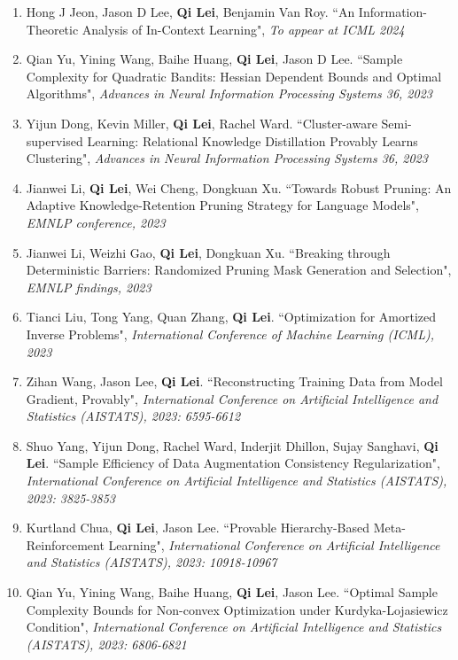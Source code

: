 \documentclass[margin, 10pt]{res} %
\begin{document}
\begin{resume}
\begin{enumerate}
\item{Hong J Jeon, Jason D Lee, \textbf{Qi Lei}, Benjamin Van Roy. ``An Information-Theoretic Analysis of In-Context Learning", \textit{To appear at ICML 2024}
}
\item{Qian Yu, Yining Wang, Baihe Huang, \textbf{Qi Lei}, Jason D Lee. ``Sample Complexity for Quadratic Bandits: Hessian Dependent Bounds and Optimal Algorithms", \textit{Advances in Neural Information Processing Systems 36, 2023}}
	
\item{Yijun Dong, Kevin Miller, \textbf{Qi Lei}, Rachel Ward. ``Cluster-aware Semi-supervised Learning: Relational Knowledge Distillation Provably Learns Clustering", \textit{Advances in Neural Information Processing Systems 36, 2023}}
	
\item{Jianwei Li, \textbf{Qi Lei}, Wei Cheng, Dongkuan Xu. ``Towards Robust Pruning: An Adaptive Knowledge-Retention Pruning Strategy for Language Models", \textit{EMNLP conference, 2023}}

\item{Jianwei Li, Weizhi Gao, \textbf{Qi Lei}, Dongkuan Xu. ``Breaking through Deterministic Barriers: Randomized Pruning Mask Generation and Selection", \textit{EMNLP findings, 2023}}
	
\item{Tianci Liu, Tong Yang, Quan Zhang, \textbf{Qi Lei}. ``Optimization for Amortized Inverse Problems", \textit{International Conference of Machine Learning (ICML), 2023}}
	
\item{Zihan Wang, Jason Lee, \textbf{Qi Lei}. ``Reconstructing Training Data from Model Gradient, Provably", \textit{International Conference on
		Artificial Intelligence and Statistics (AISTATS), 2023: 6595-6612}}
	
\item{Shuo Yang, Yijun Dong, Rachel Ward, Inderjit Dhillon, Sujay Sanghavi, \textbf{Qi Lei}. ``Sample Efficiency of Data Augmentation Consistency Regularization", \textit{International Conference on
			Artificial Intelligence and Statistics (AISTATS), 2023: 3825-3853}}
	
\item{Kurtland Chua, \textbf{Qi Lei}, Jason Lee. ``Provable Hierarchy-Based Meta-Reinforcement Learning", \textit{International Conference on
		Artificial Intelligence and Statistics (AISTATS), 2023: 10918-10967}}
	
	\item{Qian Yu, Yining Wang, Baihe Huang, \textbf{Qi Lei}, Jason Lee. ``Optimal Sample Complexity Bounds for Non-convex Optimization under Kurdyka-Lojasiewicz Condition", \textit{International Conference on
			Artificial Intelligence and Statistics (AISTATS), 2023: 6806-6821}}
	


\end{enumerate}
\end{resume}
\end{document}
